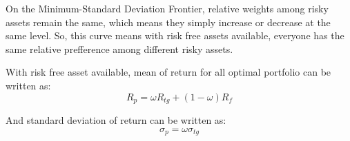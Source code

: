 \documentclass[11pt]{article}
\begin{document}
    On the Minimum-Standard Deviation Frontier, relative weights among risky
assets remain the same, which means they simply increase or decrease at
the same level. So, this curve means with risk free assets available,
everyone has the same relative prefference among different risky assets.

With risk free asset available, mean of return for all optimal portfolio
can be written as: \[
R_p = \omega R_{tg} + (1 - \omega) R_f 
\]

And standard deviation of return can be written as: \[
\sigma_p = \omega \sigma_{tg}
\]


    
    
    
    
\end{document}
